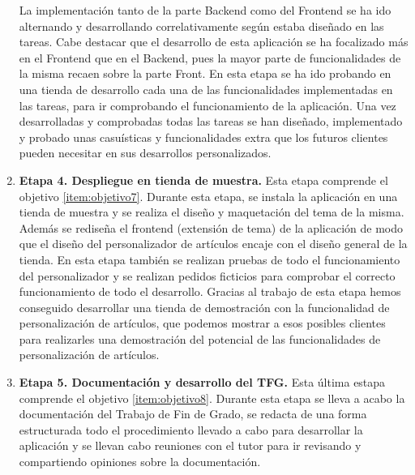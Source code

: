 \documentclass[12pt]{article}
\begin{document}
\begin{enumerate}[label={\textbf{\textbullet}}]
    La implementación tanto de la parte Backend como del Frontend se ha ido alternando y desarrollando correlativamente según estaba diseñado en las tareas. Cabe destacar que el desarrollo de esta aplicación se ha focalizado
    más en el Frontend que en el Backend, pues la mayor parte de funcionalidades de la misma recaen sobre la parte Front. En esta etapa se ha ido probando en una tienda de desarrollo cada una de las funcionalidades implementadas en las tareas, 
    para ir comprobando el funcionamiento de la aplicación. Una vez desarrolladas y comprobadas todas las tareas se han diseñado, implementado y probado unas casuísticas y funcionalidades
    extra que los futuros clientes pueden necesitar en sus desarrollos personalizados.
    \item \textbf{Etapa 4. Despliegue en tienda de muestra.} Esta etapa comprende el objetivo \ref{item:objetivo7}. 
    Durante esta etapa, se instala la aplicación en una tienda de muestra y se realiza el diseño y maquetación del tema de la misma. Además se rediseña el frontend (extensión de tema) de la aplicación de modo que el diseño del personalizador de artículos
    encaje con el diseño general de la tienda. En esta etapa también se realizan pruebas de todo el funcionamiento del personalizador y se realizan pedidos ficticios para comprobar el correcto
    funcionamiento de todo el desarrollo. Gracias al trabajo de esta etapa hemos conseguido desarrollar una tienda de demostración con la funcionalidad de personalización de artículos, que podemos
    mostrar a esos posibles clientes para realizarles una demostración del potencial de las funcionalidades de personalización de artículos.
    \item \textbf{Etapa 5. Documentación y desarrollo del TFG.} Esta última estapa comprende el objetivo \ref{item:objetivo8}. Durante esta etapa
    se lleva a acabo la documentación del Trabajo de Fin de Grado, se redacta de una forma estructurada todo el procedimiento llevado a cabo para desarrollar
    la aplicación y se llevan cabo reuniones con el tutor para ir revisando y compartiendo opiniones sobre la documentación.
\end{enumerate}
\end{document}
